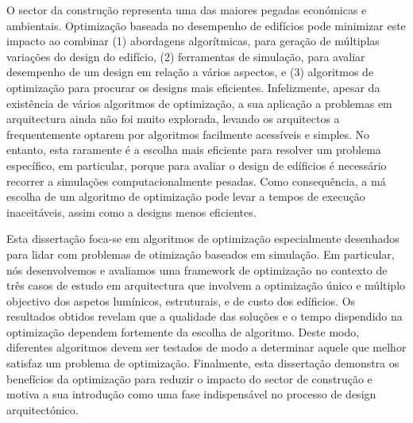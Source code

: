 \noindent 
O sector da construção representa uma das maiores pegadas económicas e ambientais. Optimização baseada no desempenho de edifícios pode minimizar este impacto ao combinar (1) abordagens algorítmicas, para geração de múltiplas variações do design do edifício, (2) ferramentas de simulação, para avaliar desempenho de um design em relação a vários aspectos, e (3) algoritmos de optimização para procurar os designs mais eficientes. Infelizmente, apesar da existência de vários algoritmos de optimização, a sua aplicação a problemas em arquitectura ainda não foi muito explorada, levando os arquitectos a frequentemente optarem por algoritmos facilmente acessíveis e simples. No entanto, esta raramente é a escolha mais eficiente para resolver um problema específico, em particular, porque para avaliar o design de edíficios é necessário recorrer a simulações computacionalmente pesadas. Como consequência, a má escolha de um algoritmo de optimização pode levar a tempos de execução inaceitáveis, assim como a designs menos eficientes.

Esta dissertação foca-se em algoritmos de optimização especialmente desenhados para lidar com problemas de otimização baseados em simulação. Em particular, nós desenvolvemos e avaliamos uma framework de optimização no contexto de três casos de estudo em arquitectura que involvem a optimização único e múltiplo objectivo dos aspetos lumínicos, estruturais, e de custo dos edíficios. Os resultados obtidos revelam que a qualidade das soluções e o tempo dispendido na optimização dependem fortemente da escolha de algoritmo. Deste modo, diferentes algoritmos devem ser testados de modo a determinar aquele que melhor satisfaz um problema de optimização. Finalmente, esta dissertação demonstra os benefícios da optimização para reduzir o impacto do sector de construção e motiva a sua introdução como uma fase indispensável no processo de design arquitectónico.

